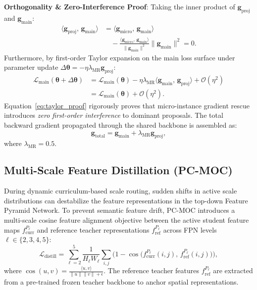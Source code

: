 \textbf{Orthogonality \& Zero-Interference Proof}: Taking the inner product of $\mathbf{g}_{\mathrm{proj}}$ and $\mathbf{g}_{\mathrm{main}}$:
\begin{align}
\langle \mathbf{g}_{\mathrm{proj}},\, \mathbf{g}_{\mathrm{main}} \rangle &= \langle \mathbf{g}_{\mathrm{micro}},\, \mathbf{g}_{\mathrm{main}} \rangle \nonumber \\
&\quad - \frac{\langle \mathbf{g}_{\mathrm{micro}},\, \mathbf{g}_{\mathrm{main}} \rangle}{\|\mathbf{g}_{\mathrm{main}}\|^2} \|\mathbf{g}_{\mathrm{main}}\|^2 = 0.
\label{eq:orthogonality_proof}
\end{align}
Furthermore, by first-order Taylor expansion on the main loss surface under parameter update $\Delta \boldsymbol{\theta} = -\eta \lambda_{\mathrm{MR}} \mathbf{g}_{\mathrm{proj}}$:
\begin{align}
\mathcal{L}_{\mathrm{main}}(\boldsymbol{\theta} + \Delta \boldsymbol{\theta}) &= \mathcal{L}_{\mathrm{main}}(\boldsymbol{\theta}) - \eta \lambda_{\mathrm{MR}} \langle \mathbf{g}_{\mathrm{main}},\, \mathbf{g}_{\mathrm{proj}} \rangle + \mathcal{O}(\eta^2) \nonumber \\
&= \mathcal{L}_{\mathrm{main}}(\boldsymbol{\theta}) + \mathcal{O}(\eta^2).
\label{eq:taylor_proof}
\end{align}
Equation~\eqref{eq:taylor_proof} rigorously proves that micro-instance gradient rescue introduces \emph{zero first-order interference} to dominant proposals. The total backward gradient propagated through the shared backbone is assembled as:
\begin{equation}
\mathbf{g}_{\mathrm{total}} = \mathbf{g}_{\mathrm{main}} + \lambda_{\mathrm{MR}} \mathbf{g}_{\mathrm{proj}},
\label{eq:g_total}
\end{equation}
where $\lambda_{\mathrm{MR}} = 0.5$.

\subsection{Multi-Scale Feature Distillation (PC-MOC)}
\label{subsec:pc_moc}
During dynamic curriculum-based scale routing, sudden shifts in active scale distributions can destabilize the feature representations in the top-down Feature Pyramid Network. To prevent semantic feature drift, PC-MOC introduces a multi-scale cosine feature alignment objective between the active student feature maps $f_{\mathrm{curr}}^{P_\ell}$ and reference teacher representations $f_{\mathrm{ref}}^{P_\ell}$ across FPN levels $\ell \in \{2, 3, 4, 5\}$:
\begin{equation}
\mathcal{L}_{\mathrm{distill}} = \sum_{\ell=2}^{5} \frac{1}{H_\ell W_\ell} \sum_{i,j} \Big( 1 - \cos\big( f_{\mathrm{curr}}^{P_\ell}(i,j),\, f_{\mathrm{ref}}^{P_\ell}(i,j) \big) \Big),
\label{eq:l_distill}
\end{equation}
where $\cos(u, v) = \frac{\langle u, v \rangle}{\|u\| \|v\| + \epsilon}$. The reference teacher features $f_{\mathrm{ref}}^{P_\ell}$ are extracted from a pre-trained frozen teacher backbone to anchor spatial representations.

